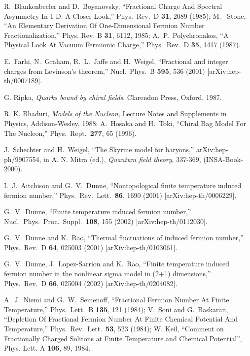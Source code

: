 \documentclass[a4paper,prd,showpacs,showkeys]{revtex4}
\begin{document}
{{\begin{thebibliography}{99}
 
  R.~Blankenbecler and D.~Boyanovsky,
``Fractional Charge And Spectral Asymmetry In 1-D: A Closer Look,''
Phys.\ Rev.\ D {\bf 31}, 2089 (1985);
M. ~Stone,
``An Elementary Derivation Of One-Dimensional Fermion Number Fractionalization,''
Phys. Rev. B {\bf 31}, 6112, 1985;
A.~P.~Polychronakos,
``A Physical Look At Vacuum Fermionic Charge,''
Phys.\ Rev.\ D {\bf 35}, 1417 (1987).

 E.~Farhi, N.~Graham, R.~L.~Jaffe and H.~Weigel,
``Fractional and integer charges from Levinson's theorem,''
Nucl.\ Phys.\ B {\bf 595}, 536 (2001)
[arXiv:hep-th/0007189].

 G. Ripka, {\it Quarks bound by chiral fields}, Clarendon Press, Oxford, 1987.

 R. K. Bhaduri, {\it Models of the Nucleon}, Lecture Notes and Supplements in Physics, Addison-Wesley, 1988;  A.~Hosaka and H.~Toki,
``Chiral Bag Model For The Nucleon,''
Phys.\ Rept.\  {\bf 277}, 65 (1996).

 J.~Schechter and H.~Weigel,
``The Skyrme model for baryons,''
arXiv:hep-ph/9907554,
in A. N. Mitra (ed.), {\it Quantum field theory},
337-369, (INSA-Book-2000).

 I.~J.~Aitchison and G.~V.~Dunne,
``Nontopological finite temperature induced fermion number,''
Phys.\ Rev.\ Lett.\  {\bf 86}, 1690 (2001)
[arXiv:hep-th/0006229].

 G.~V.~Dunne,
``Finite temperature induced fermion number,''
Nucl.\ Phys.\ Proc.\ Suppl.\  {\bf 108}, 155 (2002)
[arXiv:hep-th/0112030].

 G.~V.~Dunne and K.~Rao,
``Thermal fluctuations of induced fermion number,''
Phys.\ Rev.\ D {\bf 64}, 025003 (2001)
[arXiv:hep-th/0103061].

G.~V.~Dunne, J.~Lopez-Sarrion and K.~Rao,
``Finite temperature induced fermion number in the nonlinear sigma model  in (2+1) dimensions,''
Phys.\ Rev.\ D {\bf 66}, 025004 (2002)
[arXiv:hep-th/0204082].



 A.~J.~Niemi and G.~W.~Semenoff,
``Fractional Fermion Number At Finite Temperature,''
Phys.\ Lett.\ B {\bf 135}, 121 (1984);
V.~Soni and G.~Baskaran,
``Depletion Of Fractional Fermion Number At Finite Chemical Potential And Temperature,''
Phys.\ Rev.\ Lett.\  {\bf 53}, 523 (1984);
 W.  Keil,  ``Comment on Fractionally Charged Solitons at
Finite  Temperature and Chemical Potential'',  Phys.  Lett.  A {\bf 106}, 
89, 1984. 


\end{thebibliography}}}
\end{document}
